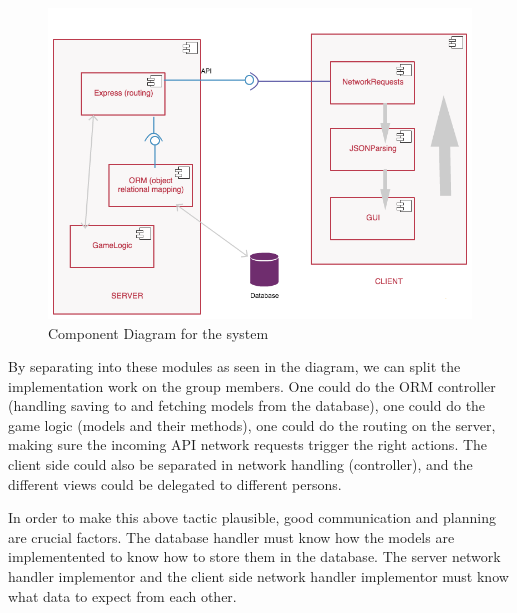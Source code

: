 \begin{figure}[H]
  \centering
    \includegraphics[width=\textwidth]{figs/component.png}
  \caption{Component Diagram for the system}
  \label{fig:component}
\end{figure}


By separating into these modules as seen in the diagram, we can split the implementation work on the group members. One could do the ORM controller (handling saving to and fetching models from the database), one could do the game logic (models and their methods), one could do the routing on the server, making sure the incoming API network requests trigger the right actions. The client side could also be separated in network handling (controller), and the different views could be delegated to different persons.

In order to make this above tactic plausible, good communication and planning are crucial factors. The database handler must know how the models are implementented to know how to store them in the database. The server network handler implementor and the client side network handler implementor must know what data to expect from each other.